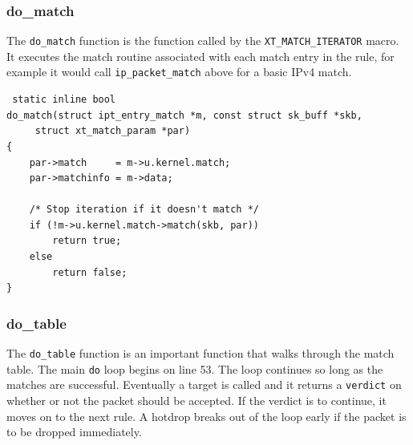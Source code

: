 \documentclass[a4paper,10pt]{article}
\newcommand{\code}[1]{\texttt{{#1}}}
\begin{document}
\subsubsection{do\_match}
The \code{do\_match} function is the function called by the
\code{XT\_MATCH\_ITERATOR} macro. It executes the match routine
associated with each match entry in the rule, for example it would call
\code{ip\_packet\_match} above for a basic IPv4 match.

\lstset{stepnumber=0}
\begin{lstlisting}
 static inline bool
do_match(struct ipt_entry_match *m, const struct sk_buff *skb,
	 struct xt_match_param *par)
{
	par->match     = m->u.kernel.match;
	par->matchinfo = m->data;

	/* Stop iteration if it doesn't match */
	if (!m->u.kernel.match->match(skb, par))
		return true;
	else
		return false;
}
\end{lstlisting}

\subsubsection{do\_table}

The \verb|do_table| function is an important function that walks through the match table. The main \verb|do| loop begins on line 53. The loop continues so long as the matches are successful. Eventually a target is called and it returns a \verb|verdict| on whether or not the packet should be accepted. If the verdict is to continue, it moves on to the next rule. A hotdrop breaks out of the loop early if the packet is to be dropped immediately.

\lstset{stepnumber=1}
\end{document}
